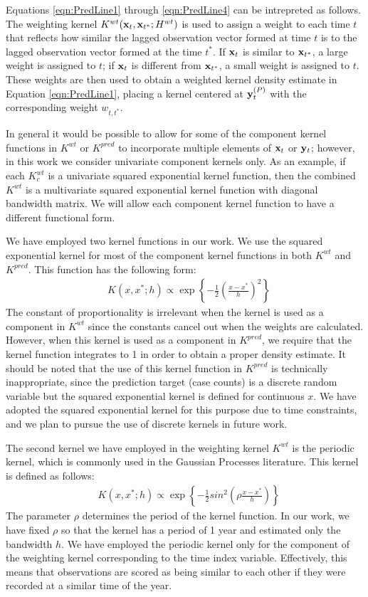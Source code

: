 \documentclass[fleqn]{article}\usepackage[]{graphicx}\usepackage[]{color}
\begin{document}
Equations \eqref{eqn:PredLine1} through \eqref{eqn:PredLine4} can be intrepreted as follows.  The weighting kernel $K^{wt}({\bf x}_t, {\bf x}_{t^*} ; H^{wt})$ is used to assign a weight to each time $t$ that reflects how similar the lagged observation vector formed at time $t$ is to the lagged observation vector formed at the time $t^*$.  If ${\bf x}_t$ is similar to ${\bf x}_{t^*}$, a large weight is assigned to $t$; if ${\bf x}_t$ is different from ${\bf x}_{t^*}$, a small weight is assigned to $t$.  These weights are then used to obtain a weighted kernel density estimate in Equation \eqref{eqn:PredLine1}, placing a kernel centered at ${\bf y}_t^{(P)}$ with the corresponding weight $w_{t, t^*}$.

In general it would be possible to allow for some of the component kernel functions in $K^{wt}$ or $K^{pred}$ to incorporate multiple elements of ${\bf x}_t$ or ${\bf y}_t$; however, in this work we consider univariate component kernels only.  As an example, if each $K^{wt}_c$ is a univariate squared exponential kernel function, then the combined $K^{wt}$ is a multivariate squared exponential kernel function with diagonal bandwidth matrix.  We will allow each component kernel function to have a different functional form.

We have employed two kernel functions in our work.  We use the squared exponential kernel for most of the component kernel functions in both $K^{wt}$ and $K^{pred}$.  This function has the following form:
\begin{align*}
&K(x, x^* ; h) \varpropto \exp\left\{ -\frac{1}{2} (\frac{x - x^*}{h})^2 \right\}
\end{align*}
The constant of proportionality is irrelevant when the kernel is used as a component in $K^{wt}$ since the constants cancel out when the weights are calculated.  However, when this kernel is used as a component in $K^{pred}$, we require that the kernel function integrates to 1 in order to obtain a proper density estimate.  It should be noted that the use of this kernel function in $K^{pred}$ is technically inappropriate, since the prediction target (case counts) is a discrete random variable but the squared exponential kernel is defined for continuous $x$.  We have adopted the squared exponential kernel for this purpose due to time constraints, and we plan to pursue the use of discrete kernels in future work.

The second kernel we have employed in the weighting kernel $K^{wt}$ is the periodic kernel, which is commonly used in the Gaussian Processes literature.  This kernel is defined as follows:
\begin{align*}
&K(x, x^* ; h) \varpropto \exp\left\{ -\frac{1}{2} sin^2(\rho \frac{x - x^*}{h}) \right\}
\end{align*}
The parameter $\rho$ determines the period of the kernel function.  In our work, we have fixed $\rho$ so that the kernel has a period of 1 year and estimated only the bandwidth $h$.  We have employed the periodic kernel only for the component of the weighting kernel corresponding to the time index variable.  Effectively, this means that observations are scored as being similar to each other if they were recorded at a similar time of the year.
\end{document}
